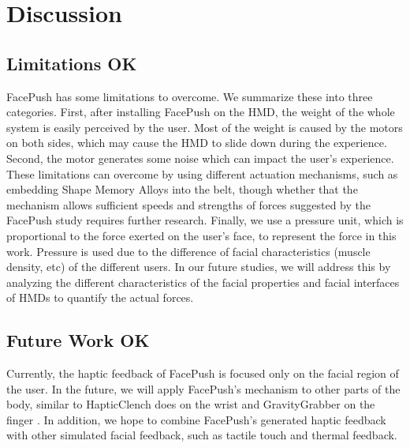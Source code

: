 \chapter{Discussion} \label{chapter:discussion}

\section{Limitations OK}
FacePush has some limitations to overcome. We summarize these into three categories. First, after installing FacePush on the HMD, the weight of the whole system is easily perceived by the user. Most of the weight is caused by the motors on both sides, which may cause the HMD to slide down during the experience. Second, the motor generates some noise which can impact the user's experience. These limitations can overcome by using different actuation mechanisms, such as embedding Shape Memory Alloys into the belt, though whether that the mechanism allows sufficient speeds and strengths of forces suggested by the FacePush study requires further research. Finally, we use a pressure unit, which is proportional to the force exerted on the user's face, to represent the force in this work. Pressure is used due to the difference of facial characteristics (muscle density, etc) of the different users. In our future studies, we will address this by analyzing the different characteristics of the facial properties and facial interfaces of HMDs to quantify the actual forces.

\section{Future Work OK}
Currently, the haptic feedback of FacePush is focused only on the facial region of the user. In the future, we will apply FacePush's mechanism to other parts of the body, similar to HapticClench does on the wrist \cite{HapticClench} and GravityGrabber on the finger \cite{Gravity.Grabber}. In addition, we hope to combine FacePush's generated haptic feedback with other simulated facial feedback, such as tactile touch and thermal feedback.
